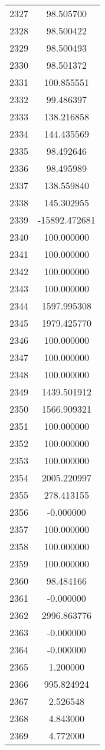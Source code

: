 \documentclass[12pt]{article}
\begin{document}
\begin{longtable}{@{}cc@{}}
2327 & 98.505700 \\
2328 & 98.500422 \\
2329 & 98.500493 \\
2330 & 98.501372 \\
2331 & 100.855551 \\
2332 & 99.486397 \\
2333 & 138.216858 \\
2334 & 144.435569 \\
2335 & 98.492646 \\
2336 & 98.495989 \\
2337 & 138.559840 \\
2338 & 145.302955 \\
2339 & -15892.472681 \\
2340 & 100.000000 \\
2341 & 100.000000 \\
2342 & 100.000000 \\
2343 & 100.000000 \\
2344 & 1597.995308 \\
2345 & 1979.425770 \\
2346 & 100.000000 \\
2347 & 100.000000 \\
2348 & 100.000000 \\
2349 & 1439.501912 \\
2350 & 1566.909321 \\
2351 & 100.000000 \\
2352 & 100.000000 \\
2353 & 100.000000 \\
2354 & 2005.220997 \\
2355 & 278.413155 \\
2356 & -0.000000 \\
2357 & 100.000000 \\
2358 & 100.000000 \\
2359 & 100.000000 \\
2360 & 98.484166 \\
2361 & -0.000000 \\
2362 & 2996.863776 \\
2363 & -0.000000 \\
2364 & -0.000000 \\
2365 & 1.200000 \\
2366 & 995.824924 \\
2367 & 2.526548 \\
2368 & 4.843000 \\
2369 & 4.772000 \\

\end{longtable}
\end{document}
